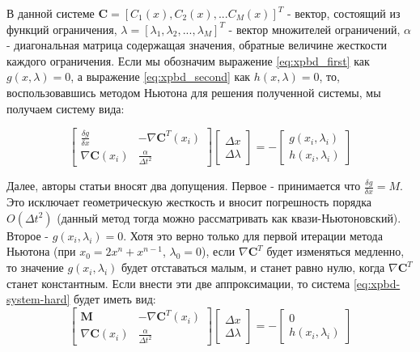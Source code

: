 	В данной системе $\textbf{C} = [C_1(x), C_2(x),... C_M(x)]^T$ - вектор, состоящий из функций ограничения, $\lambda = [\lambda_1, \lambda_2, ..., \lambda_M]^T$ - вектор множителей ограничений, $\alpha$ - диагональная матрица содержащая значения, обратные величине жесткости каждого ограничения. Если мы обозначим выражение \ref{eq:xpbd_first} как $g(x, \lambda) = 0$, а выражение \ref{eq:xpbd_second} как $h(x, \lambda) = 0$, то, воспользовавшись методом Ньютона для решения полученной системы, мы получаем систему вида:

\begin{equation}
	\left[
		\begin{array}{cc}
			\frac{\delta g}{\delta x} & -\nabla \textbf{C}^T(x_i)\\
			\nabla \textbf{C}(x_i) & \frac{\alpha}{\Delta t^2}
		\end{array}
	\right]\left[
		\begin{array} {c}
			\Delta x\\
			\Delta \lambda
		\end{array}
	\right]	= -\left[
		\begin{array}{c}
			g(x_i, \lambda_i)\\
			h(x_i, \lambda_i)
		\end{array}
	\right]
\end{equation}

	Далее, авторы статьи вносят два допущения. Первое - принимается что $\frac{\delta g}{\delta x} = M$. Это исключает геометрическую жесткость и вносит погрешность порядка $O(\Delta t^2)$ (данный метод тогда можно рассматривать как квази-Ньютоновский). Второе - $g(x_i, \lambda_i) = 0$. Хотя это верно только для первой итерации метода Ньютона (при $x_0 = 2x^n + x^{n-1}$, $\lambda_0 = 0$), если $\nabla \textbf{C}^T$ будет изменяться медленно, то значение $g(x_i, \lambda_i)$ будет отставаться малым, и станет равно нулю, когда $\nabla \textbf{C}^T$ станет константным. Если внести эти две аппроксимации, то система \ref{eq:xpbd-system-hard} будет иметь вид:
\begin{equation} \label{eq:xpbd-system-hard}
	\left[
	\begin{array}{cc}
		\textbf{M} & -\nabla \textbf{C}^T(x_i)\\
		\nabla \textbf{C}(x_i) & \frac{\alpha}{\Delta t^2}
	\end{array}
	\right]\left[
	\begin{array} {c}
		\Delta x\\
		\Delta \lambda
	\end{array}
	\right]	= -\left[
	\begin{array}{c}
		0\\
		h(x_i, \lambda_i)
	\end{array}
	\right]
\end{equation}

